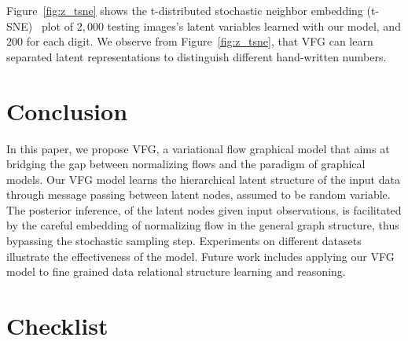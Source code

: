 \documentclass{article}
\begin{document}
Figure~\ref{fig:z_tsne} shows the t-distributed stochastic neighbor embedding (t-SNE)~\cite{maaten2008visualizing} plot of $2,000$ testing images's latent variables learned with our model, and $200$ for each digit. 
We observe from Figure~\ref{fig:z_tsne}, that VFG can learn separated latent representations to distinguish different hand-written numbers.

\vspace{-0.1in}
\section{Conclusion}\label{sec:conclusion}
\vspace{-0.05in}
In this paper, we propose VFG, a variational flow graphical model that aims at bridging the gap between normalizing flows and the paradigm of graphical models.
Our VFG model learns the hierarchical latent structure of the input data through message passing between latent nodes, assumed to be random variable.
The posterior inference, of the latent nodes given input observations, is facilitated by the careful embedding of normalizing flow in the general graph structure, thus bypassing the stochastic sampling step.
Experiments on different datasets illustrate the effectiveness of the model. 
Future work includes applying our VFG model to fine grained data relational structure learning and reasoning. 





\section*{Checklist}

\end{document}
